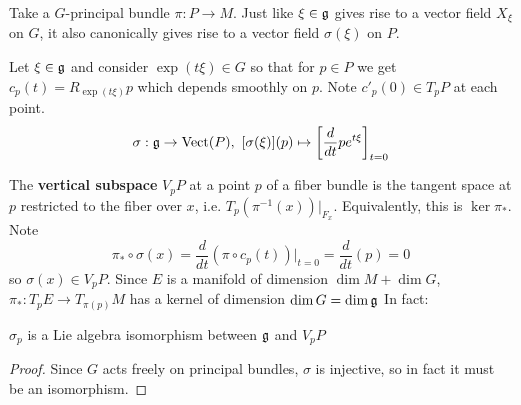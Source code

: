 		Take a $G$-principal bundle $\pi: P \rightarrow M$. 
		Just like $\xi \in \frak g$ gives rise to a vector field $X_\xi$ on $G$, it also canonically gives rise to a vector field $\sigma(\xi)$ on $P$.
		\begin{defn}
			Let $\xi \in \frak g$ and consider $\exp(t \xi) \in G$ so that for $p \in P$ we get $c_p(t) = R_{\exp(t \xi)} p$ which depends smoothly on $p$. Note $c'_p(0) \in T_p P$ at each point.
			\begin{equation}
				\sigma: \frak g \rightarrow \text{Vect}(P), ~ [\sigma(\xi)](p) \mapsto \left[ \frac{d}{dt} p e^{t \xi}\right]_{t=0}
			\end{equation}
		\end{defn}
		The \textbf{vertical subspace} $V_p P$ at a point $p$ of a fiber bundle is the tangent space at $p$ restricted to the fiber over $x$, i.e. $T_p (\pi^{-1}(x))|_{F_x}$. Equivalently, this is $\ker \pi_*$. Note
		\begin{equation}
			\pi_* \circ \sigma(x) = \frac{d}{dt} (\pi \circ c_p(t))|_{t=0} = \frac{d}{dt} (p) = 0
		\end{equation} 
		so $\sigma(x) \in V_p P$. 
		Since $E$ is a manifold of dimension $\dim M + \dim G$, $\pi_*: T_pE \rightarrow T_{\pi(p)}M$ has a kernel of dimension $\dim G = \dim \frak g$
		In fact:
		\begin{prop}
			$\sigma_p$ is a Lie algebra isomorphism between $\frak g$ and $V_pP$
		\end{prop}
		 \begin{proof}
		 	Since $G$ acts freely on principal bundles, $\sigma$ is injective, so in fact it must be an isomorphism.
		 \end{proof}
	
